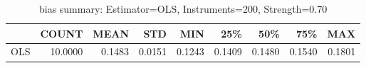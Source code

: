 \begin{table}[ht]
\centering
\caption{bias summary: Estimator=OLS, Instruments=200, Strength=0.70}
\begin{tabular}{lrrrrrrrr}
\toprule
 & COUNT & MEAN & STD & MIN & 25\% & 50\% & 75\% & MAX \\
\midrule
OLS & 10.0000 & 0.1483 & 0.0151 & 0.1243 & 0.1409 & 0.1480 & 0.1540 & 0.1801 \\
\bottomrule
\end{tabular}
\end{table}
